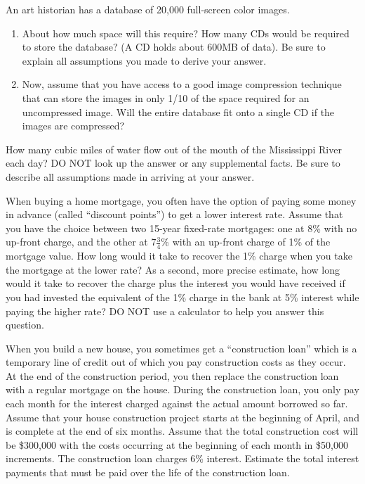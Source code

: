 \begin{exercises}
\item
An art historian has a database of 20,000 full-screen color
images.

\begin{enumerate}
\item About how much space will this require?
How many CDs would be required to store the database?
(A CD holds about 600MB of data).
Be sure to explain all assumptions you made to derive your answer.

\item Now, assume that you have access to a good image compression
technique that can store the images in only 1/10 of the space
required for an uncompressed image.
Will the entire database fit onto a single CD if the images are
compressed?
\end{enumerate}

\item
How many cubic miles of water flow out of the mouth of the Mississippi
River each day?
DO NOT look up the answer or any supplemental facts.
Be sure to describe all assumptions made in arriving at your answer.

\item
When buying a home mortgage, you often have the option of paying
some money in advance (called ``discount points'') to get
a lower interest rate.
Assume that you have the choice between two 15-year fixed-rate
mortgages: one at 8\% with no up-front charge,
and  the other at \(7\frac{3}{4}\)\% with an
up-front charge of 1\% of the mortgage value.
How long would it take to recover the 1\% charge when
you take the mortgage at the lower rate?
As a second, more precise estimate, how long would it take to recover
the charge plus the interest you would have received if you had
invested the equivalent of the 1\% charge in the bank at 5\%
interest while paying the higher rate?
DO NOT use a calculator to help you answer this question.

\item
When you build a new house, you sometimes get a ``construction loan''
which is a temporary line of credit out of which you pay construction
costs as they occur.
At the end of the construction period, you then replace the
construction loan with a regular mortgage on the house.
During the construction loan, you only pay each month for the interest
charged against the actual amount borrowed so far.
Assume that your house construction project starts at the beginning
of April, and is complete at the end of six months.
Assume that the total construction cost will be \$300,000 with the
costs occurring at the beginning of each month in \$50,000 increments.
The construction loan charges 6\% interest.
Estimate the total interest payments that must be paid over the life
of the construction loan.


\end{exercises}
